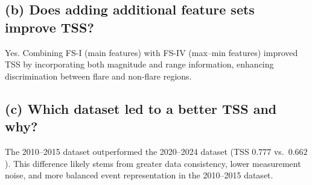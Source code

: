 \documentclass[11pt]{article}
\begin{document}
\subsection*{(b) Does adding additional feature sets improve TSS?}
\noindent Yes. Combining FS-I (main features) with FS-IV (max–min features) improved TSS by incorporating both magnitude and range information, enhancing discrimination between flare and non-flare regions.


\subsection*{(c) Which dataset led to a better TSS and why?}
\noindent The 2010–2015 dataset outperformed the 2020–2024 dataset (TSS $0.777$ vs.\ $0.662$). This difference likely stems from greater data consistency, lower measurement noise, and more balanced event representation in the 2010–2015 dataset.
\end{document}

